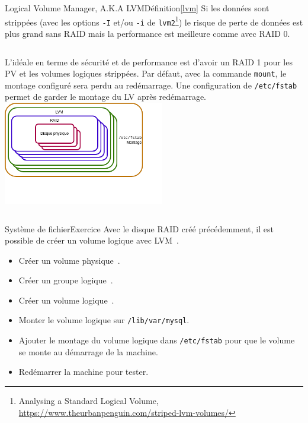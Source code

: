 \documentclass{beamer}
\begin{document}
    \begin{frame}{Logical Volume Manager, A.K.A LVM}{Définition\cref{lvm}}
        Si les données sont strippées (avec les options \lstinline{-I} et/ou \lstinline{-i} de \lstinline{lvm2}\footnote{Analysing a Standard Logical Volume, \url{https://www.theurbanpenguin.com/striped-lvm-volumes/}}) le risque de perte de données est plus grand sans RAID mais la performance est meilleure comme avec RAID 0.
        \bigbreak
        \begin{columns}
            L'idéale en terme de sécurité et de performance est d'avoir un RAID 1 pour les PV et les volumes logiques strippées.
            \bigbreak
            Par défaut, avec la commande \lstinline{mount}, le montage configuré sera perdu au redémarrage.
            Une configuration de \lstinline{/etc/fstab} permet de garder le montage du LV après redémarrage.
            \bigbreak
            \centering
            \includegraphics[width=7cm]{image/fs-stack.drawio}
        \end{columns}
    \end{frame}

    \begin{frame}{Système de fichier}{Exercice \execcounterdispinc}
        Avec le disque RAID créé précédemment, il est possible de créer un volume logique avec LVM~.
        \begin{itemize}
            \item Créer un volume physique~.
            \item Créer un groupe logique~.
            \item Créer un volume logique~.
            \item Monter le volume logique sur \lstinline{/lib/var/mysql}.
            \item Ajouter le montage du volume logique dans \lstinline{/etc/fstab} pour que le volume se monte au démarrage de la machine.
            \item Redémarrer la machine pour tester.
        \end{itemize}
    \end{frame}
\end{document}
